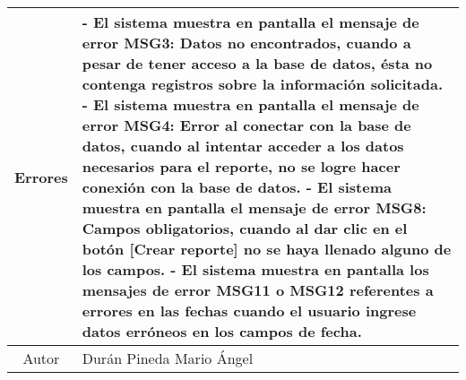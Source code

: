 \documentclass[10pt,spanish]{article}
\providecommand{\tabularnewline}{\\}
\begin{document}
\begin{table}[!ht]
\begin{centering}
\begin{tabular}{|c||c|l|}
\hline 
		\multicolumn{2}{|c|}{Errores} & \multicolumn{1}{p{12cm}|}{

    - El sistema muestra en pantalla el mensaje de error MSG3: Datos no encontrados, cuando a pesar de tener acceso a la base de datos, ésta no contenga registros sobre la información solicitada.\newline    
	- El sistema muestra en pantalla el mensaje de error MSG4: Error al conectar con la base de datos, cuando al intentar acceder a los datos necesarios para el reporte, no se logre hacer conexión con la base de datos.\newline
	- El sistema muestra en pantalla el mensaje de error MSG8: Campos obligatorios, cuando al dar clic en el botón [Crear reporte] no se haya llenado alguno de los campos.\newline
	- El sistema muestra en pantalla los mensajes de error MSG11 o MSG12 referentes a errores en las fechas cuando el usuario ingrese datos erróneos en los campos de fecha.
}\tabularnewline						
		
		\hline 		
		\multicolumn{2}{|c|}{Autor} & Durán Pineda Mario Ángel\tabularnewline
		
		\hline 				
		\end{tabular}
		\par\end{centering}
		
	
	\label{tab:CasosdeUso:nombredecasodeuso} 
	\end{table}
\end{document}
